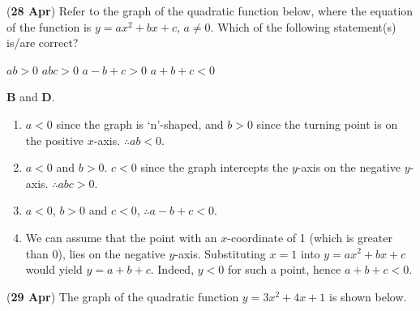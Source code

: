 \documentclass[12pt, answers]{exam} %
\begin{document}
\begin{questions}
	\question (\textbf{28 Apr}) Refer to the graph of the quadratic function
	below, where the equation of the function is \(y = ax^2 + bx + c\), \(a \neq 0\).
	Which of the following statement(s) is/are correct?
	\begin{figure}[htpb]
		\centering
	\end{figure}

	\begin{oneparchoices}
		\choice \(ab > 0\)
		\choice \(abc > 0\)
		\choice \(a - b + c > 0\)
		\choice \(a + b + c < 0\)
	\end{oneparchoices}

	\begin{solution}
		\textbf{B} and \textbf{D}.
		\begin{enumerate}
			\item \(a < 0\) since the graph is `n'-shaped, and \(b > 0\) since the turning point is on the positive \(x\)-axis. \(\therefore ab < 0\).
			\item \(a < 0\) and \(b > 0\). \(c < 0\) since the graph intercepts the \(y\)-axis on the negative \(y\)-axis. \(\therefore abc > 0\).
			\item \(a < 0\), \(b > 0\) and \(c < 0\), \(\therefore a - b + c < 0\).
			\item We can assume that the point with an \(x\)-coordinate of \num{1}
			      (which is greater than 0), lies on the negative \(y\)-axis. Substituting
			      \(x = 1\) into \(y = ax^2 + bx + c\) would yield \(y = a + b + c\). Indeed,
			      \(y < 0\) for such a point, hence \(a + b + c < 0\).
		\end{enumerate}
	\end{solution}

	\question (\textbf{29 Apr}) The graph of the quadratic function \(y = 3x^{2} + 4x + 1\) is shown below.
	\begin{figure}[htpb]
		\centering
	\end{figure}
	\begin{parts}

\end{parts}
\end{questions}
\end{document}
